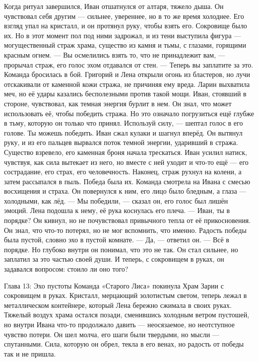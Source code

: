 \documentclass[12pt,a4paper]{book}
\begin{document}
Когда ритуал завершился, Иван отшатнулся от алтаря, тяжело дыша. Он чувствовал себя другим — сильнее, увереннее, но в то же время холоднее. Его взгляд упал на кристалл, и он протянул руку, чтобы взять его. Сокровище было их.
Но в этот момент пол под ними задрожал, и из тени выступила фигура — могущественный страж храма, существо из камня и тьмы, с глазами, горящими красным огнем.
— Вы осмелились взять то, что не принадлежит вам, — прорычал страж, его голос эхом отдавался от стен. — Теперь вы заплатите за это.
Команда бросилась в бой. Григорий и Лена открыли огонь из бластеров, но лучи отскакивали от каменной кожи стража, не причиняя ему вреда. Ларин выхватила меч, но её удары казались бесполезными против такой мощи.
Иван, стоявший в стороне, чувствовал, как темная энергия бурлит в нем. Он знал, что может использовать её, чтобы победить стража. Но это означало погрузиться ещё глубже в тьму, которую он только что принял.
Используй силу, — шептал голос в его голове. Ты можешь победить.
Иван сжал кулаки и шагнул вперёд. Он вытянул руку, и из его пальцев вырвался поток темной энергии, ударивший в стража. Существо взревело, его каменная броня начала трескаться. Иван усилил натиск, чувствуя, как сила вытекает из него, но вместе с ней уходит и что-то ещё — его сострадание, его страх, его человечность.
Наконец, страж рухнул на колени, а затем рассыпался в пыль. Победа была их.
Команда смотрела на Ивана с смесью восхищения и страха. Он повернулся к ним, его лицо было бледным, а глаза — холодными, как лёд.
— Мы победили, — сказал он, его голос был лишён эмоций.
Лена подошла к нему, её рука коснулась его плеча. — Иван, ты в порядке?
Он кивнул, но не почувствовал привычного тепла от её прикосновения. Он знал, что что-то потерял, но не мог вспомнить, что именно. Радость победы была пустой, словно эхо в пустой комнате.
— Да, — ответил он. — Всё в порядке.
Но глубоко внутри он понимал, что это не так. Он стал сильнее, но заплатил за это частью своей души. И теперь, с сокровищем в руках, он задавался вопросом: стоило ли оно того?

Глава 13: Эхо пустоты
Команда «Старого Лиса» покинула Храм Зарии с сокровищем в руках. Кристалл, мерцающий золотистым светом, теперь лежал в металлическом контейнере, который Лена бережно сжимала в своих руках. Тяжелый воздух храма остался позади, сменившись холодным ветром пустошей, но внутри Ивана что-то продолжало давить — неосязаемое, но неотступное чувство потери. Он шел молча, его шаги были твердыми, но мысли — спутанными. Сила, которую он обрел, текла в его венах, но радость от победы так и не пришла.
\end{document}
